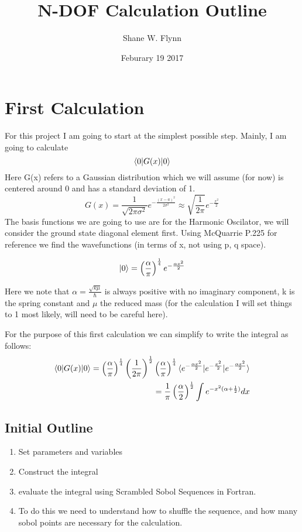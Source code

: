 \documentclass{article}
\title{N-DOF Calculation Outline}
\author{Shane W. Flynn}
\date{Feburary 19 2017}
\begin{document}
\maketitle

\section*{First Calculation}
For this project I am going to start at the simplest possible step. 
Mainly, I am going to calculate 
\begin{equation}
    \braket{0|G(x)|0}
\end{equation}
Here G(x) refers to a Gaussian distribution which we will assume (for now) is centered around 0 and has a standard deviation of 1. 
\begin{equation}
    G(x) = \frac{1}{\sqrt{2\pi \sigma^2}}e^{-\frac{(x-a)^2}{2\sigma^2}} \approx \sqrt{\frac{1}{2\pi}}e^{-\frac{x^2}{2}}
\end{equation}
The basis functions we are going to use are for the Harmonic Oscilator, we will consider the ground state diagonal element first.
Using McQuarrie P.225 for reference we find the wavefunctions (in terms of x, not using p, q space). 

\begin{equation}
    \ket{0} = \left (\frac{\alpha}{\pi}\right )^{\frac{1}{4}}e^{-\frac{\alpha x^2}{2}}
\end{equation}

Here we note that $\alpha = \frac{\sqrt{k\mu}}{\hbar}$ is always positive with no imaginary component, k is the spring constant and $\mu$ the reduced mass (for the calculation I will set things to 1 most likely, will need to be careful here). 

For the purpose of this first calculation we can simplify to write the integral as follows:
\begin{equation}
\begin{split}
      \braket{0|G(x)|0} =  \left (\frac{\alpha}{\pi}\right )^{\frac{1}{4}} \left (\frac{1}{2\pi}\right )^{\frac{1}{2}}      \left (\frac{\alpha}{\pi}\right )^{\frac{1}{4}} \braket{e^{-\frac{\alpha x^2}{2}}|e^{-\frac{x^2}{2}}|e^{-\frac{\alpha x^2}{2}}} \\
      = \frac{1}{\pi} \left (\frac{\alpha}{2}\right )^{\frac{1}{2}}\int  e^{-x^2(\alpha+\frac{1}{2})}dx
\end{split}
\end{equation}

\subsection*{Initial Outline}
\begin{enumerate}
    \item Set parameters and variables
    \item Construct the integral
    \item evaluate the integral using Scrambled Sobol Sequences in Fortran. 
    \item To do this we need to understand how to shuffle the sequence, and how many sobol points are necessary for the calculation.
\end{enumerate}
 
\end{document}
